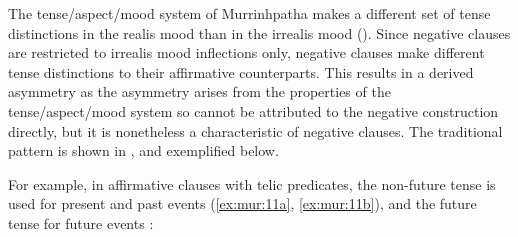 \documentclass[output=paper,colorlinks,citecolor=brown]{langscibook}
\begin{document}
The tense/aspect/mood system of Murrinhpatha makes a different set of tense distinctions in the realis mood than in the irrealis mood (\citealt{NordlingerCaudal2012}). Since negative clauses are restricted to irrealis mood inflections only, negative clauses make different tense distinctions to their affirmative counterparts. This results in a derived asymmetry \citep{Miestamo2013-wals114} as the asymmetry arises from the properties of the tense/aspect/mood system so cannot be attributed to the negative construction directly, but it is nonetheless a characteristic of negative clauses. The traditional pattern is shown in , and exemplified below.

\begin{table}
\small
{}
    \caption{Murrinhpatha TAM inflection in positive and negative clauses \citep{NordlingerCaudal2012}}
    \label{tab:mur:2}
\end{table}

For example, in affirmative clauses with telic predicates, the non-future tense is used for present and past events (\ref{ex:mur:11a}, \ref{ex:mur:11b}), and the future tense for future events :
\end{document}
